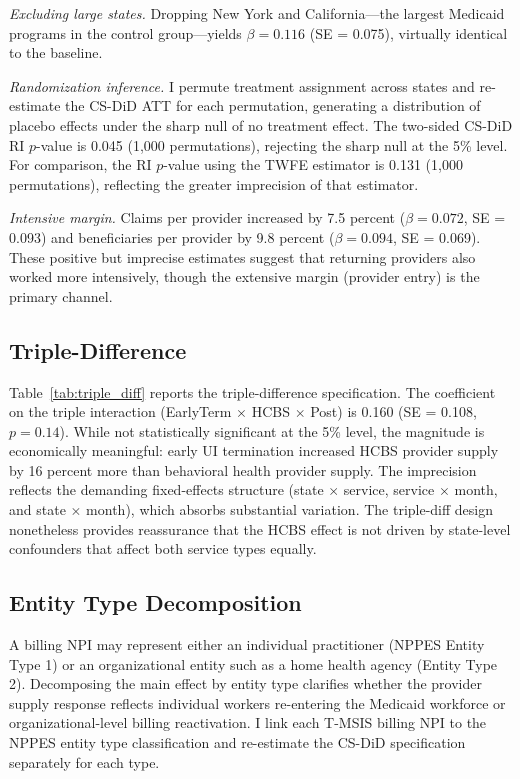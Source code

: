 \documentclass[12pt]{article}
\begin{document}
\textit{Excluding large states.} Dropping New York and California---the largest Medicaid programs in the control group---yields $\beta = 0.116$ (SE = 0.075), virtually identical to the baseline.

\textit{Randomization inference.} I permute treatment assignment across states and re-estimate the CS-DiD ATT for each permutation, generating a distribution of placebo effects under the sharp null of no treatment effect. The two-sided CS-DiD RI $p$-value is 0.045 (1,000 permutations), rejecting the sharp null at the 5\% level. For comparison, the RI $p$-value using the TWFE estimator is 0.131 (1,000 permutations), reflecting the greater imprecision of that estimator.

\textit{Intensive margin.} Claims per provider increased by 7.5 percent ($\beta = 0.072$, SE = 0.093) and beneficiaries per provider by 9.8 percent ($\beta = 0.094$, SE = 0.069). These positive but imprecise estimates suggest that returning providers also worked more intensively, though the extensive margin (provider entry) is the primary channel.



\subsection{Triple-Difference}

Table~\ref{tab:triple_diff} reports the triple-difference specification. The coefficient on the triple interaction (EarlyTerm $\times$ HCBS $\times$ Post) is 0.160 (SE = 0.108, $p = 0.14$). While not statistically significant at the 5\% level, the magnitude is economically meaningful: early UI termination increased HCBS provider supply by 16 percent more than behavioral health provider supply. The imprecision reflects the demanding fixed-effects structure (state $\times$ service, service $\times$ month, and state $\times$ month), which absorbs substantial variation. The triple-diff design nonetheless provides reassurance that the HCBS effect is not driven by state-level confounders that affect both service types equally.



\subsection{Entity Type Decomposition}
\label{sec:entity_type}

A billing NPI may represent either an individual practitioner (NPPES Entity Type 1) or an organizational entity such as a home health agency (Entity Type 2). Decomposing the main effect by entity type clarifies whether the provider supply response reflects individual workers re-entering the Medicaid workforce or organizational-level billing reactivation. I link each T-MSIS billing NPI to the NPPES entity type classification and re-estimate the CS-DiD specification separately for each type.
\end{document}
